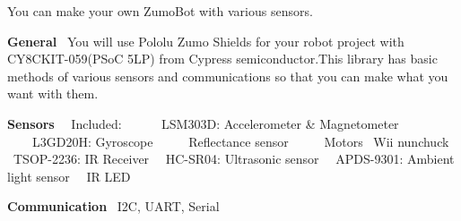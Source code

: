 You can make your own Zumo\+Bot with various sensors. ~\newline
~\newline
 

{\bfseries General}~\newline
 You will use Pololu Zumo Shields for your robot project with C\+Y8\+C\+K\+I\+T-\/059(P\+SoC 5\+LP) from Cypress semiconductor.\+This library has basic methods of various sensors and communications so that you can make what you want with them. ~\newline
 ~\newline
~\newline
 

{\bfseries Sensors}~\newline
 ~Included\+: ~\newline
 ~~~~L\+S\+M303D\+: Accelerometer \& Magnetometer~\newline
 ~~~~L3\+G\+D20H\+: Gyroscope~\newline
 ~~~~Reflectance sensor~\newline
 ~~~~Motors ~Wii nunchuck~\newline
 ~T\+S\+O\+P-\/2236\+: IR Receiver~\newline
 ~H\+C-\/\+S\+R04\+: Ultrasonic sensor~\newline
 ~A\+P\+D\+S-\/9301\+: Ambient light sensor~\newline
 ~IR L\+ED ~\newline
~\newline
~\newline
 

{\bfseries Communication}~\newline
 I2C, U\+A\+RT, Serial~\newline
 